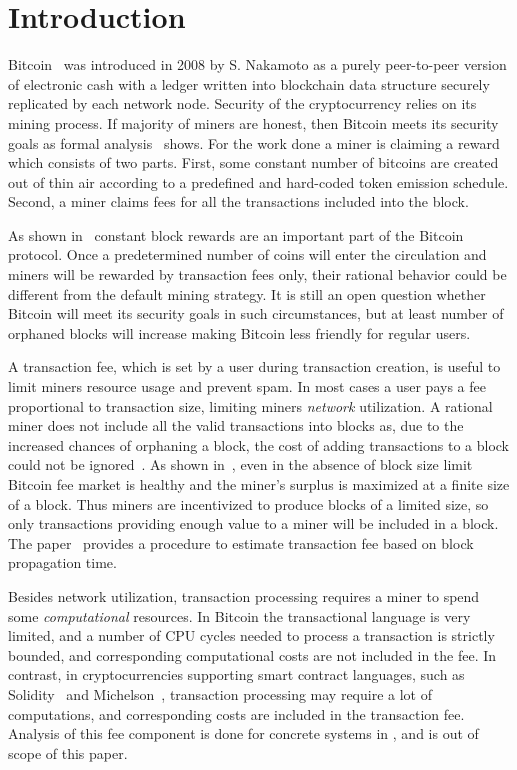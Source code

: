 \documentclass[]{llncs}   %
\begin{document}
\section{Introduction}

Bitcoin~\cite{Nakamoto2008} was introduced in 2008 by S. Nakamoto as a purely
peer-to-peer version of electronic cash with a ledger written into blockchain
data structure securely replicated by each network node. Security of the cryptocurrency 
relies on its mining process. If majority of miners are honest, then Bitcoin
meets its security goals as formal analysis~\cite{Garay2015} shows. For the work
done a miner is claiming a reward which consists of two parts. First, some
constant number of bitcoins are created out of thin air according to a
predefined and hard-coded token emission schedule. Second, a miner claims fees
for all the transactions included into the block.

As shown in~\cite{carlsten2016instability} constant block rewards are an important
part of the Bitcoin protocol. Once a predetermined number of coins will enter the circulation
and miners will be rewarded by transaction fees only, their rational behavior could be
different from the default mining strategy. It is still an open question whether
Bitcoin will meet its security goals in such circumstances, but at least number of
orphaned blocks will increase making Bitcoin less friendly for regular users.

A transaction fee, which is set by a user during transaction creation, is
useful to limit miners resource usage and prevent spam. In most cases a user pays a fee proportional to transaction size,
limiting miners {\em network} utilization. A rational miner does not
include all the valid transactions into blocks as, due to the increased
chances of orphaning a block, the cost of adding transactions to a block
could not be ignored~\cite{andersen2013,rizun2015transaction}. As shown
in~\cite{rizun2015transaction}, even in the absence of block size limit
Bitcoin fee market is healthy and the miner's surplus is maximized at a
finite size of a block. Thus miners are incentivized to produce blocks of a limited size, so 
only transactions providing enough value to a miner will be included in a block. The 
paper~\cite{rizun2015transaction} provides a procedure to estimate
transaction fee based on block propagation time.

Besides network utilization, transaction processing requires a miner
to spend some {\em computational} resources.
In Bitcoin the transactional language\cite{script} is very limited, and 
a number of CPU cycles needed to process a transaction
is strictly bounded, and corresponding computational costs are not included in the fee.
In contrast, in cryptocurrencies supporting smart contract
languages, such as Solidity~\cite{solidity} and Michelson~\cite{tezosScript},
transaction processing may require a lot of computations, and
corresponding costs are included in the transaction fee. Analysis of this fee component is done for concrete systems
in \cite{Earlz2017,luu2015demystifying}, and is out of scope of this paper.
\end{document}
